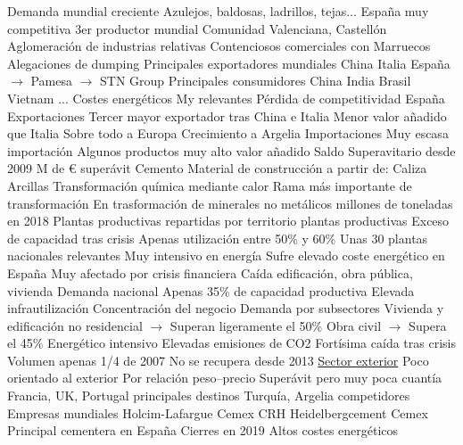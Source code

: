 \documentclass{nuevotema}
\begin{document}
\begin{esquemal}
				\4 Demanda mundial creciente
				\4 Azulejos, baldosas, ladrillos, tejas...
				\4 España muy competitiva
				\4[] 3er productor mundial
				\4 Comunidad Valenciana, Castellón
				\4[] Aglomeración de industrias relativas
				\4 Contenciosos comerciales con Marruecos
				\4[] Alegaciones de dumping
				\4 Principales exportadores mundiales
				\4[] China
				\4[] Italia
				\4[] España
				\4[] $\to$ Pamesa
				\4[] $\to$ STN Group
				\4 Principales consumidores
				\4[] China
				\4[] India
				\4[] Brasil
				\4[] Vietnam
				\4[] ...
				\4 Costes energéticos
				\4[] My relevantes
				\4[] Pérdida de competitividad España
				\4 Exportaciones
				\4[] Tercer mayor exportador tras China e Italia
				\4[] Menor valor añadido que Italia
				\4[] Sobre todo a Europa
				\4[] Crecimiento a Argelia
				\4 Importaciones
				\4[] Muy escasa importación
				\4[] Algunos productos muy alto valor añadido
				\4 Saldo
				\4[] Superavitario desde 2009
				 M de € superávit
			\3 Cemento
				\4 Material de construcción a partir de:
				\4[] Caliza
				\4[] Arcillas
				\4[] Transformación química mediante calor
				\4 Rama más importante de transformación
				\4[] En trasformación de minerales no metálicos
				 millones de toneladas en 2018
				\4 Plantas productivas repartidas por territorio
				 plantas productivas
				\4 Exceso de capacidad tras crisis
				\4[] Apenas utilización entre 50\% y 60\%
				\4 Unas 30 plantas nacionales relevantes
				\4 Muy intensivo en energía
				\4[] Sufre elevado coste energético en España
				\4 Muy afectado por crisis financiera
				\4[] Caída edificación, obra pública, vivienda
				\4 Demanda nacional
				\4[] Apenas 35\% de capacidad productiva
				\4[$\then$] Elevada infrautilización
				\4[$\then$] Concentración del negocio
				\4 Demanda por subsectores
				\4[] Vivienda y edificación no residencial
				\4[] $\to$ Superan ligeramente el 50\%
				\4[] Obra civil
				\4[] $\to$ Supera el 45\%
				\4 Energético intensivo
				\4 Elevadas emisiones de CO2
				\4 Fortísima caída tras crisis
				\4 Volumen apenas 1/4 de 2007
				\4 No se recupera desde 2013
				\4 \underline{Sector exterior}
				\4 Poco orientado al exterior
				\4[] Por relación peso--precio
				\4[] Superávit pero muy poca cuantía
				\4[] Francia, UK, Portugal principales destinos
				\4[] Turquía, Argelia competidores
				\4 Empresas mundiales
				\4[] Holcim-Lafargue
				\4[] Cemex
				\4[] CRH
				\4[] Heidelbergcement
				\4 Cemex
				\4[] Principal cementera en España
				\4[] Cierres en 2019
				\4[] Altos costes energéticos

\end{esquemal}
\end{document}
